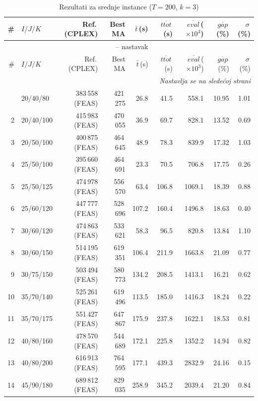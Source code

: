 \documentclass[12pt,a4paper]{article}
\begin{document}
\begin{longtable}{r l r r r r r r r}
\caption{Rezultati za srednje instance ($T=200$, $k=3$)} \\
\toprule
\# & $I/J/K$ & Ref.\,(CPLEX) & Best MA & $\bar t$\,(s) & $\overline{ttot}$\,(s) & $\overline{eval}$\,($\times 10^3$) & $\overline{gap}$\,(\%) & $\sigma$\,(\%) \\
\midrule
\endfirsthead
\multicolumn{9}{c}{\tablename\ \thetable{} -- nastavak} \\
\toprule
\# & $I/J/K$ & Ref.\,(CPLEX) & Best MA & $\bar t$\,(s) & $\overline{ttot}$\,(s) & $\overline{eval}$\,($\times 10^3$) & $\overline{gap}$\,(\%) & $\sigma$\,(\%) \\
\midrule
\endhead
\midrule
\multicolumn{9}{r}{\textit{Nastavlja se na sledećoj strani}} \\
\endfoot
\bottomrule
\endlastfoot
1 & 20/40/80 & 383\,558 (FEAS) & 421\,275 & 26.8 & 41.5 & 558.1 & 10.95 & 1.01 \\
2 & 20/40/100 & 415\,983 (FEAS) & 470\,055 & 36.9 & 69.7 & 828.1 & 13.52 & 0.69 \\
3 & 20/50/100 & 400\,875 (FEAS) & 464\,645 & 48.9 & 78.3 & 839.9 & 17.32 & 1.03 \\
4 & 25/50/100 & 395\,660 (FEAS) & 464\,691 & 23.3 & 70.5 & 706.8 & 17.75 & 0.26 \\
5 & 25/50/125 & 474\,978 (FEAS) & 556\,570 & 63.4 & 106.8 & 1069.1 & 18.39 & 0.88 \\
6 & 25/60/120 & 447\,777 (FEAS) & 528\,696 & 107.2 & 160.4 & 1496.8 & 18.63 & 0.40 \\
7 & 30/60/120 & 474\,863 (FEAS) & 533\,621 & 58.3 & 96.5 & 820.8 & 13.84 & 1.10 \\
8 & 30/60/150 & 514\,195 (FEAS) & 619\,351 & 106.4 & 211.9 & 1663.8 & 21.09 & 0.77 \\
9 & 30/75/150 & 503\,494 (FEAS) & 580\,773 & 134.2 & 208.5 & 1413.1 & 16.21 & 0.62 \\
10 & 35/70/140 & 525\,261 (FEAS) & 619\,496 & 113.5 & 185.0 & 1416.3 & 18.24 & 0.22 \\
11 & 35/70/175 & 551\,427 (FEAS) & 647\,867 & 175.9 & 237.8 & 1622.1 & 18.53 & 0.81 \\
12 & 40/80/160 & 478\,570 (FEAS) & 544\,689 & 172.1 & 225.8 & 1352.2 & 14.94 & 0.82 \\
13 & 40/80/200 & 616\,913 (FEAS) & 764\,595 & 177.1 & 439.3 & 2832.9 & 24.16 & 0.15 \\
14 & 45/90/180 & 689\,812 (FEAS) & 829\,035 & 258.9 & 345.2 & 2039.4 & 21.20 & 0.84 \\

\end{longtable}
\end{document}
